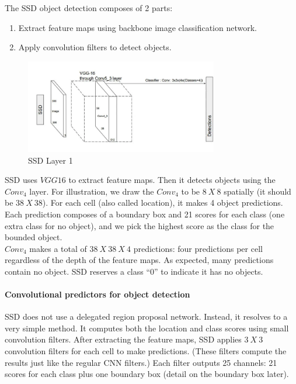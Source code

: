 \documentclass[12pt]{article}
\begin{document}
The SSD object detection composes of 2 parts:
\begin{enumerate}[leftmargin=1cm, labelwidth=4cm]
  \item Extract feature maps using backbone image classification network.
  \item Apply convolution filters to detect objects.
\end{enumerate}

\begin{figure}[h]
    \centering
    \includegraphics[width=0.75\textwidth]{images/ssd_layer1.png}
    \caption{SSD Layer 1}
    \label{fig:ssd2}
\end{figure}

{
\fontsize{12}{14}\selectfont
SSD uses $VGG16$ to extract feature maps. Then it detects objects using the $Conv_4$ layer. For illustration, we draw the $Conv_4$ to be $8\ X\ 8$ spatially (it should be $38\ X\ 38$). For each cell (also called location), it makes 4 object predictions.
\\
Each prediction composes of a boundary box and 21 scores for each class (one extra class for no object), and we pick the highest score as the class for the bounded object.
\\
$Conv_4$ makes a total of $38\ X\ 38\ X\ 4$ predictions: four predictions per cell regardless of the depth of the feature maps. As expected, many predictions contain no object. SSD reserves a class “0” to indicate it has no objects.
}

\paragraph{Convolutional predictors for object detection}
{
\fontsize{12}{14}\selectfont
SSD does not use a delegated region proposal network. Instead, it resolves to a very simple method. It computes both the location and class scores using small convolution filters. After extracting the feature maps, SSD applies $3\ X\ 3$ convolution filters for each cell to make predictions. (These filters compute the results just like the regular CNN filters.) Each filter outputs 25 channels: 21 scores for each class plus one boundary box (detail on the boundary box later).
}
\end{document}
